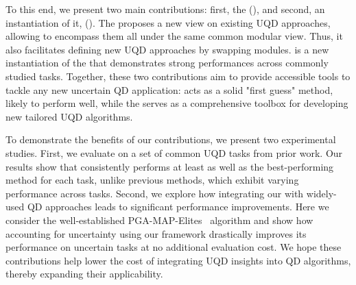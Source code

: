 
To this end, we present two main contributions: first, the \Longframework{} (\framework{}), and second, an instantiation of it, \Longname{} (\name{}).
The \framework{} proposes a new view on existing UQD approaches, allowing to encompass them all under the same common modular view. 
Thus, it also facilitates defining new UQD approaches by swapping modules.
\name{} is a new instantiation of the \framework{} that demonstrates strong performances across commonly studied tasks. 
Together, these two contributions aim to provide accessible tools to tackle any new uncertain QD application: \name{} acts as a solid "first guess" method, likely to perform well, while the \framework{} serves as a comprehensive toolbox for developing new tailored UQD algorithms.



To demonstrate the benefits of our contributions, we present two experimental studies.
First, we evaluate \name{} on a set of common UQD tasks from prior work. Our results show that \name{} consistently performs at least as well as the best-performing method for each task, unlike previous methods, which exhibit varying performance across tasks. Second, we explore how integrating our \framework{} with widely-used QD approaches leads to significant performance improvements. Here we consider the well-established PGA-MAP-Elites~\cite{nilsson2021policy} algorithm and show how accounting for uncertainty using our framework drastically improves its performance on uncertain tasks at no additional evaluation cost. 
We hope these contributions help lower the cost of integrating UQD insights into QD algorithms, thereby expanding their applicability.

